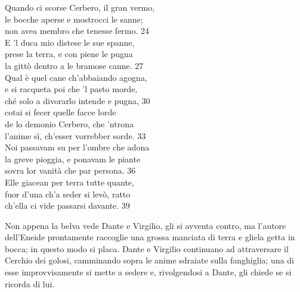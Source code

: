 \documentclass[10pt,a4paper]{article}
\begin{document}
	\begin{estratto}
		Quando ci scorse Cerbero, il gran vermo,\\
		le bocche aperse e mostrocci le sanne;\\
		non avea membro che tenesse fermo.		24\\
		
		E ’l duca mio distese le sue spanne,\\
		prese la terra, e con piene le pugna\\
		la gittò dentro a le bramose canne.		27\\
		
		Qual è quel cane ch’abbaiando agogna,\\
		e si racqueta poi che ’l pasto morde,\\
		ché solo a divorarlo intende e pugna,		30\\
		
		cotai si fecer quelle facce lorde\\
		de lo demonio Cerbero, che ’ntrona\\
		l’anime sì, ch’esser vorrebber sorde.		33\\
		
		Noi passavam su per l’ombre che adona\\
		la greve pioggia, e ponavam le piante\\
		sovra lor vanità che par persona.		36\\
		
		Elle giacean per terra tutte quante,\\
		fuor d’una ch’a seder si levò, ratto\\
		ch’ella ci vide passarsi davante.		39\\
	\end{estratto}
	
	Non appena la belva vede Dante e Virgilio, gli si avventa contro, ma l’autore dell’Eneide prontamente raccoglie una grossa manciata di terra e gliela getta in bocca; in questo modo si placa. Dante e Virgilio continuano ad attraversare il Cerchio dei golosi, camminando sopra le anime sdraiate sulla fanghiglia; una di esse improvvisamente si mette a sedere e, rivolgendosi a Dante, gli chiede se si ricorda di lui.
	
\end{document}
